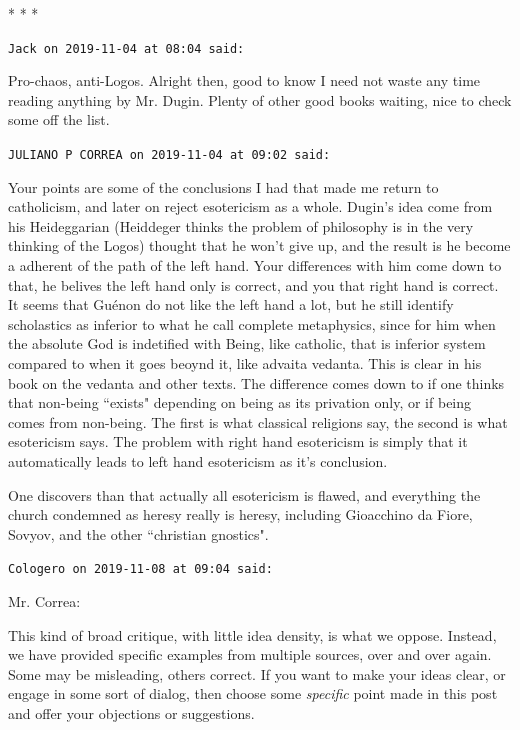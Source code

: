 \begin{center}* * *\end{center}

\begin{footnotesize}\begin{sffamily}



\texttt{Jack on 2019-11-04 at 08:04 said: }

Pro-chaos, anti-Logos. Alright then, good to know I need not waste any time reading anything by Mr. Dugin. Plenty of other good books waiting, nice to check some off the list.


\hfill

\texttt{JULIANO P CORREA on 2019-11-04 at 09:02 said: }

Your points are some of the conclusions I had that made me return to catholicism, and later on reject esotericism as a whole. Dugin's idea come from his Heideggarian (Heiddeger thinks the problem of philosophy is in the very thinking of the Logos) thought that he won't give up, and the result is he become a adherent of the path of the left hand. Your differences with him come down to that, he belives the left hand only is correct, and you that right hand is correct. It seems that Guénon do not like the left hand a lot, but he still identify scholastics as inferior to what he call complete metaphysics, since for him when the absolute God is indetified with Being, like catholic, that is inferior system compared to when it goes beoynd it, like advaita vedanta. This is clear in his book on the vedanta and other texts. The difference comes down to if one thinks that non-being ``exists" depending on being as its privation only, or if being comes from non-being. The first is what classical religions say, the second is what esotericism says. The problem with right hand esotericism is simply that it automatically leads to left hand esotericism as it's conclusion.

One discovers than that actually all esotericism is flawed, and everything the church condemned as heresy really is heresy, including Gioacchino da Fiore, Sovyov, and the other ``christian gnostics".


\hfill

\texttt{Cologero on 2019-11-08 at 09:04 said: }

Mr. Correa:

This kind of broad critique, with little idea density, is what we oppose. Instead, we have provided specific examples from multiple sources, over and over again. Some may be misleading, others correct. If you want to make your ideas clear, or engage in some sort of dialog, then choose some \emph{specific} point made in this post and offer your objections or suggestions.


\end{sffamily}
\end{footnotesize}
